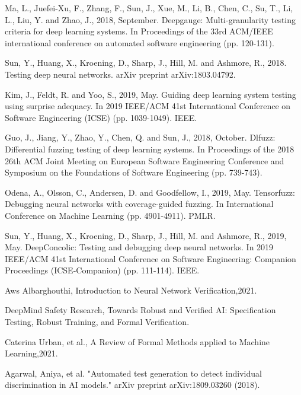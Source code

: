 \begin{singlespace}
\begin{thebibliography}{}
    Ma, L., Juefei-Xu, F., Zhang, F., Sun, J., Xue, M., Li, B., Chen, C., Su, T., Li, L., Liu, Y. and Zhao, J., 2018, September. Deepgauge: Multi-granularity testing criteria for deep learning systems. In Proceedings of the 33rd ACM/IEEE international conference on automated software engineering (pp. 120-131).
    
    Sun, Y., Huang, X., Kroening, D., Sharp, J., Hill, M. and Ashmore, R., 2018. Testing deep neural networks. arXiv preprint arXiv:1803.04792.

    Kim, J., Feldt, R. and Yoo, S., 2019, May. Guiding deep learning system testing using surprise adequacy. In 2019 IEEE/ACM 41st International Conference on Software Engineering (ICSE) (pp. 1039-1049). IEEE.
  
   
    Guo, J., Jiang, Y., Zhao, Y., Chen, Q. and Sun, J., 2018, October. Dlfuzz: Differential fuzzing testing of deep learning systems. In Proceedings of the 2018 26th ACM Joint Meeting on European Software Engineering Conference and Symposium on the Foundations of Software Engineering (pp. 739-743).

     Odena, A., Olsson, C., Andersen, D. and Goodfellow, I., 2019, May. Tensorfuzz: Debugging neural networks with coverage-guided fuzzing. In International Conference on Machine Learning (pp. 4901-4911). PMLR.

    Sun, Y., Huang, X., Kroening, D., Sharp, J., Hill, M. and Ashmore, R., 2019, May. DeepConcolic: Testing and debugging deep neural networks. In 2019 IEEE/ACM 41st International Conference on Software Engineering: Companion Proceedings (ICSE-Companion) (pp. 111-114). IEEE.


    Aws Albarghouthi, Introduction to Neural Network Verification,2021.
    
    DeepMind Safety Research, Towards Robust and Verified AI: Specification Testing, Robust Training, and Formal Verification.

    Caterina Urban, et al., A Review of Formal Methods applied to Machine Learning,2021.

    






 Agarwal, Aniya, et al. "Automated test generation to detect individual discrimination in AI models." arXiv preprint arXiv:1809.03260 (2018).


\end{thebibliography}
\end{singlespace}
